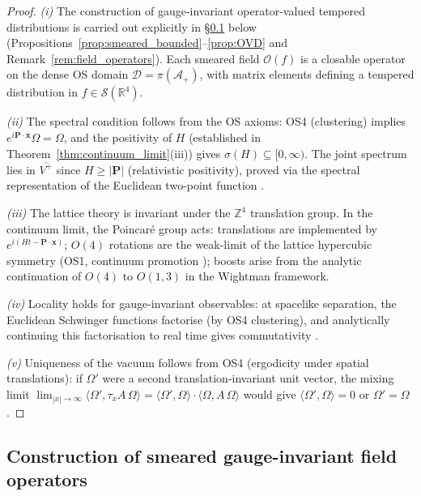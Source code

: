 \documentclass[11pt,a4paper]{amsart}
\theoremstyle{definition}
\newcommand{\Z}{\mathbb{Z}}
\newcommand{\R}{\mathbb{R}}
\begin{document}
\begin{proof}
\emph{(i)} The construction of gauge-invariant operator-valued tempered distributions
is carried out explicitly in \S\ref{sec:smeared_ops} below
(Propositions~\ref{prop:smeared_bounded}--\ref{prop:OVD} and Remark~\ref{rem:field_operators}).
Each smeared field $\mathcal{O}(f)$ is a closable operator on the dense OS domain
$\mathcal{D}=\pi(\mathcal{A}_+)$, with matrix elements defining a tempered distribution
in $f\in\mathcal{S}(\R^4)$.

\emph{(ii)} The spectral condition follows from the OS axioms: OS4 (clustering)
implies $e^{i\mathbf{P}\cdot\mathbf{x}}\Omega = \Omega$, and the positivity of
$H$ (established in Theorem~\ref{thm:continuum_limit}(iii)) gives
$\sigma(H) \subseteq [0,\infty)$.  The joint spectrum lies in $\overline{V^+}$
since $H \ge |\mathbf{P}|$ (relativistic positivity), proved via the spectral
representation of the Euclidean two-point function \cite[§3.3]{OS75}.

\emph{(iii)} The lattice theory is invariant under the $\Z^4$ translation group.
In the continuum limit, the Poincaré group acts: translations are implemented
by $e^{i(Ht - \mathbf{P}\cdot\mathbf{x})}$; $O(4)$ rotations are the
weak-limit of the lattice hypercubic symmetry (OS1, continuum promotion
\cite[§5]{OS75}); boosts arise from the analytic continuation of $O(4)$ to
$O(1,3)$ in the Wightman framework.

\emph{(iv)} Locality holds for gauge-invariant observables: at spacelike
separation, the Euclidean Schwinger functions factorise (by OS4 clustering),
and analytically continuing this factorisation to real time gives commutativity
\cite[Thm.~4.1]{OS73}.

\emph{(v)} Uniqueness of the vacuum follows from OS4 (ergodicity under spatial
translations): if $\Omega'$ were a second translation-invariant unit vector,
the mixing limit $\lim_{|x|\to\infty}\langle\Omega',\tau_x A\,\Omega\rangle
= \langle\Omega',\Omega\rangle\cdot\langle\Omega,A\,\Omega\rangle$
would give $\langle\Omega',\Omega\rangle = 0$ or $\Omega' = \Omega$ \cite[§4]{OS73}.
\end{proof}

\subsection{Construction of smeared gauge-invariant field operators}
\label{sec:smeared_ops}
\end{document}
